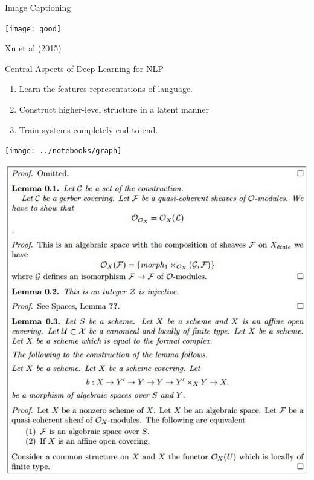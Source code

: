 \documentclass{beamer}
\begin{document}
\begin{frame}{Image Captioning}
  \begin{center}
    \texttt{[image: good]}
    \caption{Xu et al (2015)}
  \end{center}
\end{frame}

\begin{frame}{Central Aspects of Deep Learning for NLP}
  \begin{enumerate}
  \item Learn the features representations of language.
    \pause
    \air 

  \item Construct higher-level structure in a latent manner
    \pause
    
    \air

  \item Train systems completely end-to-end.
  \end{enumerate}
\end{frame}

\begin{frame}
  \vspace{-5cm}
  
  \hspace*{-2cm}
  \texttt{[image: ../notebooks/graph]}
\end{frame}

\begin{frame}
  \begin{center}
    \includegraphics[height=\textheight]{../latex3}
  \end{center}
\end{frame}
\end{document}
